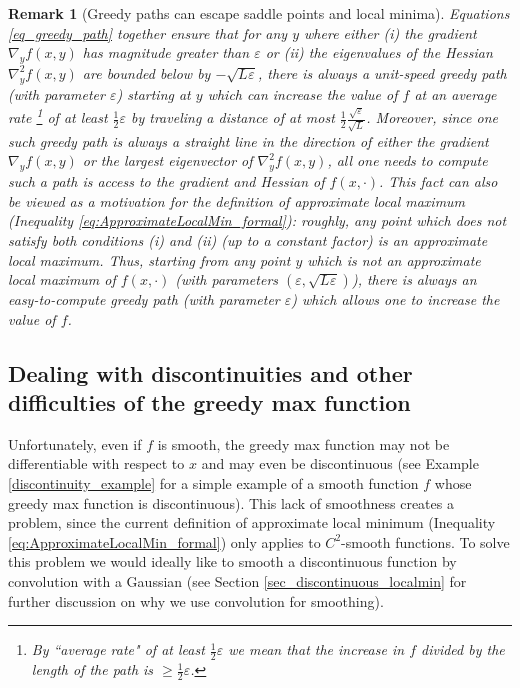 \documentclass[11pt,letterpaper]{article}
\renewcommand{\epsilon}{\varepsilon}
\newtheorem{remark}[theorem]{Remark}
\begin{document}
\begin{remark} [Greedy paths can escape saddle points and local minima] \label{rem_escaping_saddle_points}
%
Equations \eqref{eq_greedy_path} together ensure that for any  $y$ where either 
%
 (i) the gradient  $\nabla_y f(x,y)$ has magnitude greater than $\epsilon$ or 
%
 (ii) the eigenvalues of the Hessian $\nabla_y^2 f(x,y)$ are bounded below by $-\sqrt{L_{} \epsilon}$, there is always a unit-speed greedy path (with parameter $\epsilon$) starting at $y$ which can increase the value of $f$ at an average rate
 \footnote{By ``average rate" of at least $\frac{1}{2} \epsilon$ we mean that the increase in $f$ divided by the length of the path is $\geq \frac{1}{2} \epsilon$.} %
 of at least $\frac{1}{2} \epsilon$ by traveling a distance of at most $\frac{1}{2}\frac{\sqrt{\epsilon}}{\sqrt{L_{}}}$. 
%
 Moreover, since one such greedy path is always a straight line in the direction of either the gradient $\nabla_y f(x,y)$ or 
  the largest eigenvector of $\nabla_y^2 f(x,y)$, all one needs to compute such a path is access to the gradient and Hessian of $f(x,\cdot)$. 
 This fact can also be viewed as a motivation for the definition of approximate local maximum (Inequality \eqref{eq:ApproximateLocalMin_formal}): roughly, any point
   which does not satisfy both conditions (i) and (ii) (up to a constant factor) is an approximate local maximum. 
   Thus, starting from any point $y$ which is not an approximate local maximum of $f(x, \cdot)$ (with parameters $(\epsilon, \sqrt{L_{} \epsilon})$), 
    there is always an easy-to-compute greedy path (with parameter $\epsilon$) which allows one to increase the value of $f$.
\end{remark}


\subsection{Dealing with discontinuities and other difficulties of the greedy max function} \label{sec_discontinuities1}
%


    
    Unfortunately, even if $f$ is smooth, the greedy max function may not be differentiable with respect to $x$ and may even be discontinuous (see Example \ref{discontinuity_example} for a simple example of a smooth function $f$ whose greedy max function is discontinuous).  %
%
This lack of smoothness creates a problem, since the current definition of approximate local minimum (Inequality \eqref{eq:ApproximateLocalMin_formal}) only applies to $C^2$-smooth functions. 
%
 To solve this problem we would ideally like to smooth a discontinuous function by convolution with a Gaussian (see Section \ref{sec_discontinuous_localmin} for further discussion on why we use convolution for smoothing).
    
\end{document}
